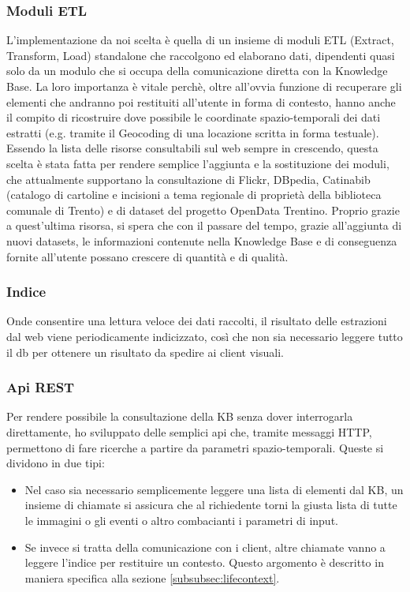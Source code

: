 \documentclass[sigproc-sp.tex]{subfiles}
\begin{document}
\subsubsection{Moduli ETL}
L’implementazione da noi scelta è quella di un insieme di moduli ETL (Extract, Transform, Load) standalone che raccolgono ed elaborano dati, dipendenti quasi solo da un modulo che si occupa della comunicazione diretta con la Knowledge Base. La loro importanza è vitale perchè, oltre all’ovvia funzione di recuperare gli elementi che andranno poi restituiti all’utente in forma di contesto, hanno anche il compito di ricostruire dove possibile le coordinate spazio-temporali dei dati estratti (e.g. tramite il Geocoding di una locazione scritta in forma testuale). Essendo la lista delle risorse consultabili sul web sempre in crescendo, questa scelta è stata fatta per rendere semplice l’aggiunta e la sostituzione dei moduli, che attualmente supportano la consultazione di Flickr, DBpedia, Catinabib (catalogo di cartoline e incisioni a tema regionale di proprietà della biblioteca comunale di Trento) e di dataset del progetto OpenData Trentino. Proprio grazie a quest’ultima risorsa, si spera che con il passare del tempo, grazie all’aggiunta di nuovi datasets, le informazioni contenute nella Knowledge Base e di conseguenza fornite all’utente possano crescere di quantità e di qualità.

\subsubsection{Indice}
Onde consentire una lettura veloce dei dati raccolti, il risultato delle estrazioni dal web viene periodicamente indicizzato, così che non sia necessario leggere tutto il db per ottenere un risultato da spedire ai client visuali.

\subsubsection{Api REST}
Per rendere possibile la consultazione della KB senza dover interrogarla direttamente, ho sviluppato delle semplici api che, tramite messaggi HTTP, permettono di fare ricerche a partire da parametri spazio-temporali. Queste si dividono in due tipi:
\begin{itemize}
\item Nel caso sia necessario semplicemente leggere una lista di elementi dal KB, un insieme di chiamate si assicura che al richiedente torni la giusta lista di tutte le immagini o gli eventi o altro combacianti i parametri di input.
\item Se invece si tratta della comunicazione con i client, altre chiamate vanno a leggere l’indice per restituire un contesto. Questo argomento è descritto in maniera specifica alla sezione \ref{subsubsec:lifecontext}.
\end{itemize}
\end{document}
